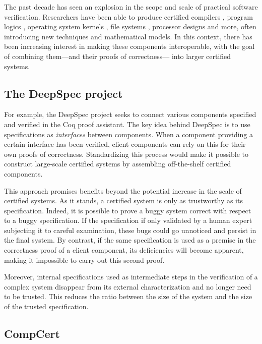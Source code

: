 \documentclass[11pt,oneside,draft]{book}
\theoremstyle{definition}
\begin{document}
The past decade has seen an explosion
in the scope and scale of practical software verification.
Researchers have been able to produce certified
compilers \citep{compcert},
program logics \citep{vst},
operating system kernels \citep{sel4,popl15},
file systems \citep{fscq},
processor designs \citep{safe,kami} and
more,
often introducing new techniques
and mathematical models.
In this context,
there has been increasing interest in
making these components
interoperable,
with the goal of
combining them---and their proofs of correctness---%
into larger certified systems.


\subsection{The DeepSpec project} %

For example, the DeepSpec project \citep{deepspec}
seeks to connect various components
specified and verified in the Coq proof assistant.
The key idea behind DeepSpec
is to use specifications as \emph{interfaces}
between components.
When a component providing a certain interface
has been verified,
client components can rely on this
for their own proofs of correctness.
Standardizing this process would make it possible
to construct large-scale certified systems
by assembling off-the-shelf certified components.

This approach promises benefits
beyond the potential increase in the scale of
certified systems.
As it stands,
a certified system is only
as trustworthy as its specification.
Indeed,
it is possible to prove a buggy system correct
with respect to a buggy specification.
If the specification if only validated by
a human expert subjecting it to careful examination,
these bugs could go unnoticed
and persist in the final system.
By contrast,
if the same specification is used as a premise
in the correctness proof of a client component,
its deficiencies will become apparent,
making it impossible to carry out this second proof.

Moreover,
internal specifications used
as intermediate steps
in the verification of a complex system
disappear from its external characterization
and no longer need to be trusted.
This reduces the ratio between the size of the system
and the size of the trusted specification.


\subsection{CompCert} %
\end{document}
